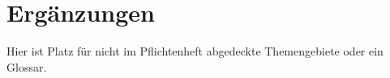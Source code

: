 \chapter{Ergänzungen}
Hier ist Platz für nicht im Pflichtenheft abgedeckte Themengebiete oder ein
Glossar.

